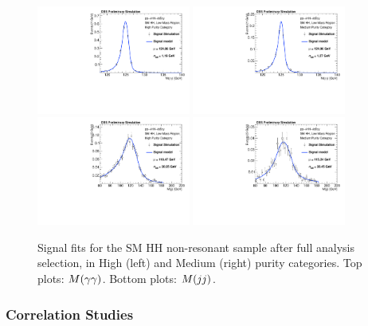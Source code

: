 \begin{figure}[h]
  \centering
  \includegraphics[width=0.45\textwidth]{figures/sec-signals/SMLM_signal_fit_mgg_cat0}\hfil
  \includegraphics[width=0.45\textwidth]{figures/sec-signals/SMLM_signal_fit_mgg_cat1}\hfil
  \includegraphics[width=0.45\textwidth]{figures/sec-signals/SMLM_signal_fit_mjj_cat0}\hfil
  \includegraphics[width=0.45\textwidth]{figures/sec-signals/SMLM_signal_fit_mjj_cat1}\hfil
  \caption{Signal fits for the SM HH non-resonant sample after full analysis selection, in High (left) and Medium (right) purity categories. Top plots: $M(\gamma\gamma)$. Bottom plots: $M(jj)$.}
  \label{fig:sig_lowmassSM}
\end{figure}

\subsubsection{Correlation Studies}

